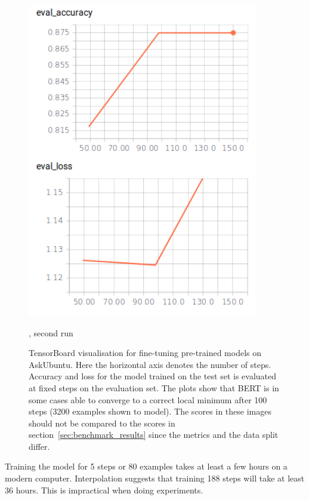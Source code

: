 \begin{figure}
\begin{minipage}{0.30\textwidth}
        \includegraphics[width=0.9\textwidth]{figures/tensorboard_askubuntu_large_2.png}
        \caption*{, second run}
    \end{minipage}
    \caption{TensorBoard visualisation for fine-tuning pre-trained models on AskUbuntu.
    Here the horizontal axis denotes the number of steps.
    Accuracy and loss for the model trained on the test set is evaluated at fixed steps on the evaluation set.
    The plots show that BERT is in some cases able to converge to a correct local minimum after 100 steps (3200 examples shown to model).
    The scores in these images should not be compared to the scores in section~\ref{sec:benchmark_results} since the metrics and the data split differ.}
    \label{fig:tensorboard}
\end{figure}
Training the model for 5 steps or 80 examples takes at least a few hours on a modern computer.
Interpolation suggests that training 188 steps will take at least 36 hours.
This is impractical when doing experiments.

